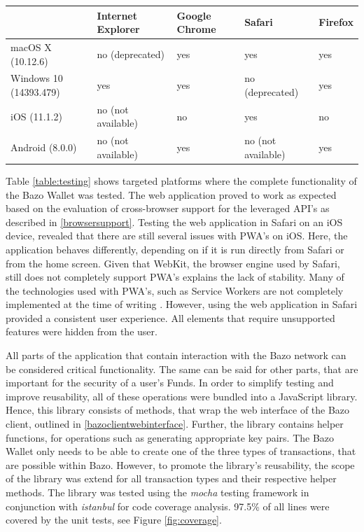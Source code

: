 \begin{center}
    \begin{tabular}{ | l | l | l | l | p{2cm} |}
    \hline
      & Internet Explorer & Google Chrome & Safari & Firefox \\ \hline
    macOS X (10.12.6)  & no (deprecated) & yes & yes & yes \\ \hline
    Windows 10 (14393.479)  & yes & yes & no (deprecated) & yes \\ \hline    
    iOS (11.1.2)  & no (not available) & no & yes & no \\ \hline
    Android (8.0.0)  & no (not available) & yes & no (not available) & yes \\ \hline
    \end{tabular}
    \label{table:testing}
    \end{center}
Table \ref{table:testing} shows targeted platforms where the complete functionality of the Bazo Wallet was tested. The web application proved to work as expected based on the evaluation of cross-browser support for the leveraged API's as described in \ref{browsersupport}. Testing the web application in Safari on an iOS device, revealed that there are still several issues with PWA's on iOS. Here, the application behaves differently, depending on if it is run directly from Safari or from the home screen. Given that WebKit, the browser engine used by Safari, still does not completely support PWA's explains the lack of stability. Many of the technologies used with PWA's, such as Service Workers are not completely implemented at the time of writing \cite{webkitsw}. However, using the web application in Safari provided a consistent user experience. All elements that require unsupported features were hidden from the user.
 
All parts of the application that contain interaction with the Bazo network can be considered critical functionality. The same can be said for other parts, that are important for the security of a user's Funds. In order to simplify testing and improve reusability, all of these operations were bundled into a JavaScript library. Hence, this library consists of methods, that wrap the web interface of the Bazo client, outlined in \ref{bazoclientwebinterface}. Further, the library contains helper functions, for operations such as generating appropriate key pairs. The Bazo Wallet only needs to be able to create one of the three types of transactions, that are possible within Bazo. However, to promote the library's reusability, the scope of the library was extend for all transaction types and their respective helper methods.
The library was tested using the \textit{mocha} testing framework in conjunction with \textit{istanbul} for code coverage analysis. 97.5\% of all lines were covered by the unit tests, see Figure \ref{fig:coverage}.

